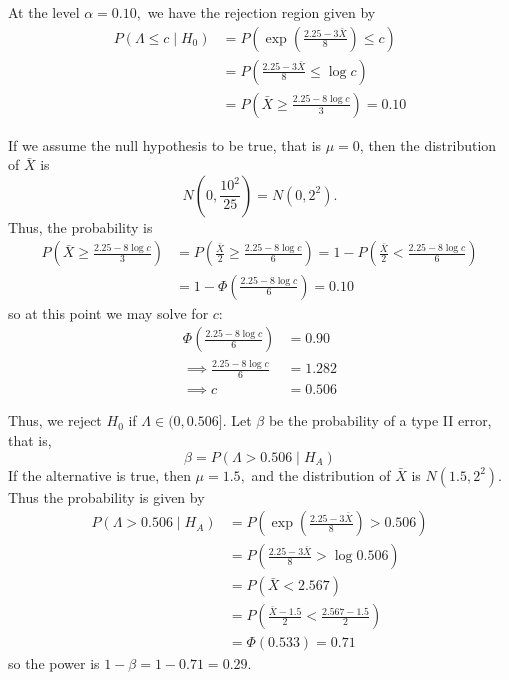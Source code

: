 \documentclass{article}
\begin{document}
\begin{itemize}
\begin{soln}
			At the level $\alpha=0.10,$ we have the rejection region given by
			\begin{align*}
				P(\Lambda\le c\mid H_0) &= P\left( \exp\left( \frac{2.25-3\bar{X}}{8} \right)\le c \right) \\
				&= P\left( \frac{2.25-3\bar{X}}{8} \le \log c\right) \\
				&= P\left( \bar{X} \ge \frac{2.25-8\log c}{3} \right)= 0.10
			\end{align*}

			If we assume the null hypothesis to be true, that is $\mu=0$, then the distribution of $\bar{X}$ is \[N\left( 0, \frac{10^2}{25} \right) = N(0, 2^2).\] Thus, the probability is
			\begin{align*}
				P\left(\bar{X}\ge \frac{2.25-8\log c}{3}\right) &= P\left( \frac{\bar{X}}{2}\ge \frac{2.25-8\log c}{6} \right) = 1-P\left( \frac{\bar{X}}{2}< \frac{2.25-8\log c}{6} \right) \\
				&= 1-\Phi\left( \frac{2.25-8\log c}{6} \right) = 0.10 
			\end{align*} so at this point we may solve for $c:$
			\begin{align*}
				\Phi\left( \frac{2.25-8\log c}{6} \right) &= 0.90 \\
				\implies \frac{2.25-8\log c}{6} &= 1.282 \\
				\implies c &= 0.506
			\end{align*}

			Thus, we reject $H_0$ if $\Lambda\in (0, 0.506].$ Let $\beta$ be the probability of a type II error, that is, \[\beta=P(\Lambda>0.506\mid H_A)\] If the alternative is true, then $\mu=1.5,$ and the distribution of $\bar{X}$ is $N(1.5, 2^2).$ Thus the probability is given by
			\begin{align*}
				P(\Lambda>0.506\mid H_A) &= P\left( \exp\left( \frac{2.25-3\bar{X}}{8}\right)>0.506 \right) \\
				&= P\left( \frac{2.25-3\bar{X}}{8}>\log 0.506 \right) \\
				&= P\left(\bar{X}<2.567\right) \\
				&= P\left(\frac{\bar{X}-1.5}{2} < \frac{2.567-1.5}{2}\right) \\
				&= \Phi(0.533) = 0.71
			\end{align*} so the power is $1-\beta=1-0.71=0.29.$
		


\end{soln}
\end{itemize}
\end{document}
